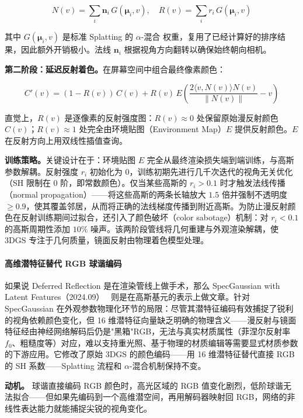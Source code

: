 \begin{equation}
N(v) = \sum_i \mathbf{n}_i \, G(\boldsymbol{\mu}_i, v), \quad R(v) = \sum_i r_i \, G(\boldsymbol{\mu}_i, v)
\end{equation}

其中 $G(\boldsymbol{\mu}_i, v)$ 是标准 Splatting 的 $\alpha$-混合 权重，复用了已经计算好的排序结果，因此额外开销极小。法线 $\mathbf{n}_i$ 根据视角方向翻转以确保始终朝向相机。

\textbf{第二阶段：延迟反射着色。}在屏幕空间中组合最终像素颜色：

\begin{equation}
C'(v) = (1 - R(v)) \, C(v) + R(v) \, E\!\left(\frac{2\langle v, N(v)\rangle N(v)}{\|N(v)\|} - v\right)
\end{equation}

直觉上，$R(v)$ 是逐像素的反射强度图：$R(v) \approx 0$ 处保留原始漫反射颜色 $C(v)$；$R(v) \approx 1$ 处完全由环境贴图（Environment Map）$E$ 提供反射颜色。$E$ 在反射方向上用双线性插值查询。

\textbf{训练策略。}关键设计在于：环境贴图 $E$ 完全从最终渲染损失端到端训练，与高斯参数解耦。反射强度 $r_i$ 初始化为 $0$，训练初期先进行几千次迭代的视角无关优化（SH 限制在 0 阶，即常数颜色）。仅当某些高斯的 $r_i > 0.1$ 时才触发法线传播（normal propagation）——将这些高斯的两条长轴放大 $1.5$ 倍并强制不透明度 $\geq 0.9$，使其覆盖邻居，从而将正确的法线梯度传播到附近高斯。为防止漫反射颜色在反射训练期间过拟合，还引入了颜色破坏（color sabotage）机制：对 $r_i < 0.1$ 的高斯周期性添加 $10\%$ 噪声。该两阶段管线将几何重建与外观渲染解耦，使 3DGS 专注于几何质量，镜面反射由物理着色模型处理。

\paragraph{高维潜特征替代 RGB 球谐编码}

如果说 Deferred Reflection 是在渲染管线上做手术，那么 SpecGaussian with Latent Features（2024.09）~\cite{2409_05868} 则是在高斯基元的表示上做文章。针对 SpecGaussian 在外观参数物理化环节的局限：尽管其潜特征编码有效捕捉了锐利的视角依赖颜色变化，但 16 维潜特征向量缺乏明确的物理含义——漫反射与镜面特征经由神经网络解码后仍是"黑箱"RGB，无法与真实材质属性（菲涅尔反射率 $f_0$、粗糙度等）对应，难以支持重光照、基于物理的材质编辑等需要显式材质参数的下游应用。它修改了原始 3DGS 的颜色编码——用 16 维潜特征替代直接 RGB 的 SH 系数——Splatting 流程和 $\alpha$-混合机制保持不变。

\textbf{动机。} 球谐直接编码 RGB 颜色时，高光区域的 RGB 值变化剧烈，低阶球谐无法拟合——但如果先编码到一个高维潜空间，再用解码器映射回 RGB，网络的非线性表达能力就能捕捉尖锐的视角变化。

